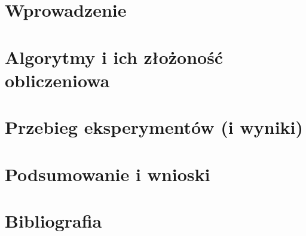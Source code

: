 \documentclass[12pt]{article}
\begin{document}
    


\section{Wprowadzenie}
\section{Algorytmy i ich złożoność obliczeniowa}
\section{Przebieg eksperymentów (i wyniki)}
\section{Podsumowanie i wnioski}
\section{Bibliografia}
\end{document}
